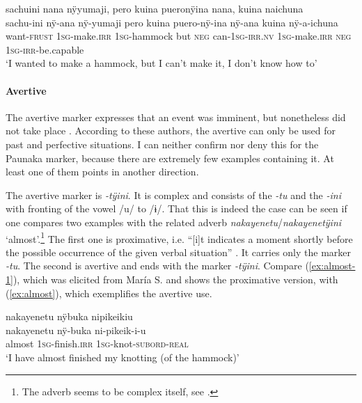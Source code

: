 \ea\label{ex:FRUST-want-2}
\begingl
\glpreamble sachuini nana nÿyumaji, pero kuina pueronÿina nana, kuina naichuna\\
\gla sachu-ini nÿ-ana nÿ-yumaji pero kuina puero-nÿ-ina nÿ-ana kuina nÿ-a-ichuna\\
\glb want-\textsc{frust} 1\textsc{sg}-make.\textsc{irr} 1\textsc{sg}-hammock but \textsc{neg} can-1\textsc{sg}-\textsc{irr.nv} 1\textsc{sg}-make.\textsc{irr} \textsc{neg} 1\textsc{sg}-\textsc{irr}-be.capable\\
\glft ‘I wanted to make a hammock, but I can’t make it, I don’t know how to’
\endgl
\trailingcitation{[rxx-e181031l-1]}
\xe
{}

\paragraph{Avertive}\label{sec:FRUST-Avertive}

The avertive marker expresses that an event was imminent, but nonetheless did not take place \citep[859]{Kuteva2019}. According to these authors, the avertive can only be used for past and perfective situations. I can neither confirm nor deny this for the Paunaka marker, because there are extremely few examples containing it. At least one of them points in another direction.

The avertive marker is \textit{-tÿini}. It is complex and consists of the  \textit{-tu} and the  \textit{-ini} with fronting of the vowel /u/ to /ɨ/. That this is indeed the case can be seen if one compares two examples with the related adverb \textit{nakayenetu}/\textit{nakayenetÿini} ‘almost’.\footnote{The adverb seems to be complex itself, see .} The first one is proximative, i.e. “[i]t indicates a moment shortly before the possible occurrence of the given verbal situation” \citep[859]{Kuteva2019}. It carries only the  marker \textit{-tu}. The second is avertive and ends with the marker \textit{-tÿini}. Compare (\ref{ex:almost-1}), which was elicited from María S. and shows the proximative version, with (\ref{ex:almost}), which exemplifies the avertive use.

\ea\label{ex:almost-1}
\begingl
\glpreamble nakayenetu nÿbuka nipikeikiu\\
\gla nakayenetu nÿ-buka ni-pikeik-i-u\\
\glb almost 1\textsc{sg}-finish.\textsc{irr} 1\textsc{sg}-knot-\textsc{subord}-\textsc{real}\\
\glft ‘I have almost finished my knotting (of the hammock)’
\endgl
\trailingcitation{[rxx-e181022le]}
\xe

